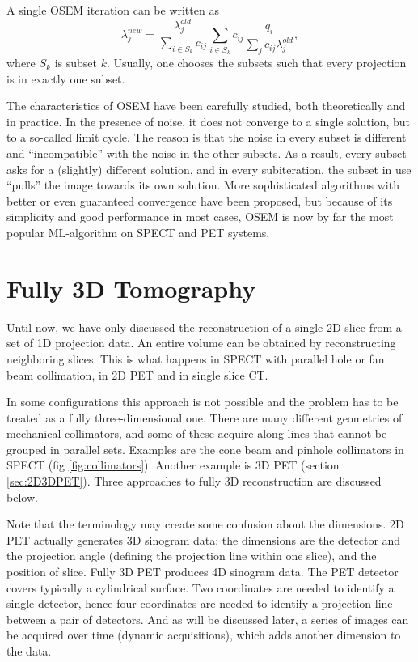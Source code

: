 \documentclass[11pt,oneside]{book}
\begin{document}
A single OSEM iteration can be written as
\begin{equation}
  \lambda_j^{new}  =  \frac{\lambda_j^{old}}{\sum_{i\in S_k} c_{ij}}
           \sum_{i\in S_k} c_{ij}  \frac{q_i}{\sum_j c_{ij} \lambda_j^{old}},
           \label{eq:osem}
\end{equation}
where $S_k$ is subset $k$. Usually, one chooses the subsets such that
every projection is in exactly one subset.

The characteristics of OSEM have been carefully studied, both
theoretically and in practice. In the presence of noise, it does not
converge to a single solution, but to a so-called limit cycle. The
reason is that the noise in every subset is different and
``incompatible'' with the noise in the other subsets. As a result,
every subset asks for a (slightly) different solution, and in every
subiteration, the subset in use ``pulls'' the image towards its own
solution. More sophisticated algorithms with better or even guaranteed
convergence have been proposed, but because of its simplicity and good
performance in most cases, OSEM is now by far the most popular
ML-algorithm on SPECT and PET systems.



\section{Fully 3D Tomography}
Until now, we have only discussed the reconstruction of a single 2D slice from
a set of 1D projection data. An entire volume can be obtained by
reconstructing neighboring slices.  This is what happens in SPECT with
parallel hole or fan beam collimation, in 2D PET and in single slice CT.

In some configurations this approach is not possible and the problem
has to be treated as a fully three-dimensional one. There are many
different geometries of mechanical collimators, and some of these
acquire along lines that cannot be grouped in parallel sets. Examples
are the cone beam and pinhole collimators in SPECT (fig
\ref{fig:collimators}). Another example is 3D PET (section
\ref{sec:2D3DPET}). Three approaches to fully 3D reconstruction are
discussed below.

Note that the terminology may create some confusion about the
dimensions. 2D PET actually generates 3D sinogram data: the dimensions
are the detector and the projection angle (defining the projection
line within one slice), and the position of slice. Fully 3D PET
produces 4D sinogram data. The PET detector covers typically a
cylindrical surface. Two coordinates are needed to identify a single
detector, hence four coordinates are needed to identify a projection
line between a pair of detectors. And as will be discussed later, a series
of images can be acquired over time (dynamic acquisitions), which adds
another dimension to the data.
\end{document}

